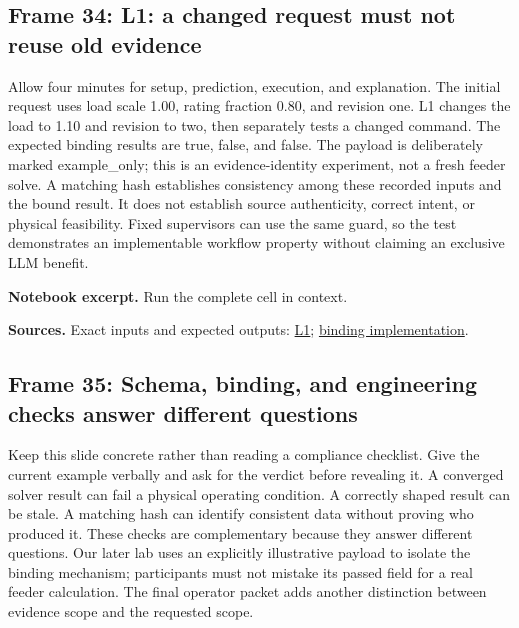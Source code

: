 \documentclass[11pt]{article}
\begin{document}
\subsection*{Frame 34: L1: a changed request must not reuse old evidence}
Allow four minutes for setup, prediction, execution, and explanation. The initial request uses load scale 1.00, rating fraction 0.80, and revision one. L1 changes the load to 1.10 and revision to two, then separately tests a changed command. The expected binding results are true, false, and false. The payload is deliberately marked example\_only; this is an evidence-identity experiment, not a fresh feeder solve. A matching hash establishes consistency among these recorded inputs and the bound result. It does not establish source authenticity, correct intent, or physical feasibility. Fixed supervisors can use the same guard, so the test demonstrates an implementable workflow property without claiming an exclusive LLM benefit.\par
\par\noindent\begin{minipage}{\linewidth}\textbf{Notebook excerpt.} Run the complete cell in context.\par \end{minipage}\par
\par\nopagebreak\begin{minipage}{\linewidth}{\footnotesize\color{slate}\textbf{Sources.} Exact inputs and expected outputs: \href{../Classroom_Labs.ipynb}{L1}; \href{../src/classroom_labs.py}{binding implementation}.\par}\end{minipage}\par\medskip
\subsection*{Frame 35: Schema, binding, and engineering checks answer different questions}
Keep this slide concrete rather than reading a compliance checklist. Give the current example verbally and ask for the verdict before revealing it. A converged solver result can fail a physical operating condition. A correctly shaped result can be stale. A matching hash can identify consistent data without proving who produced it. These checks are complementary because they answer different questions. Our later lab uses an explicitly illustrative payload to isolate the binding mechanism; participants must not mistake its passed field for a real feeder calculation. The final operator packet adds another distinction between evidence scope and the requested scope.\par
\end{document}
